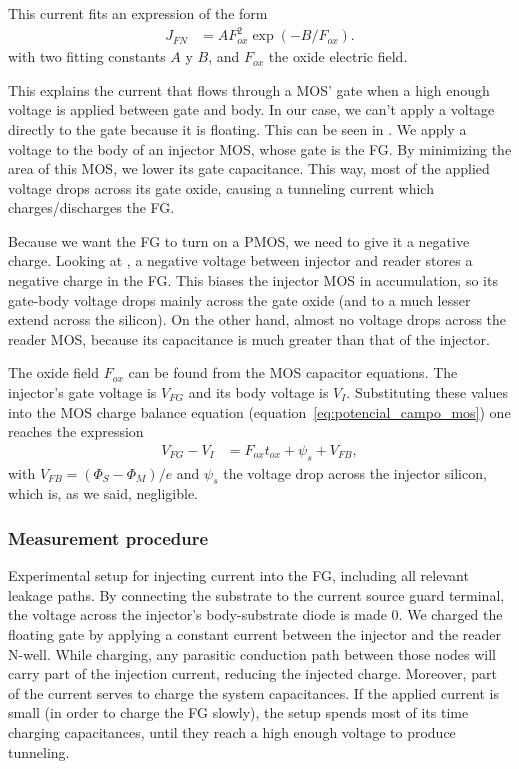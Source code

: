 This current fits an expression of the form
\begin{align*}
    J_{FN} &= AF_{ox}^2\exp(-B/F_{ox}).
\end{align*}
with two fitting constants $A$ y $B$,
and $F_{ox}$ the oxide electric field.

This explains the current that flows through a MOS' gate
when a high enough voltage is applied between gate and body.
In our case, we can't apply a voltage directly to the gate because it is floating.
This can be seen in .
We apply a voltage to the body of an injector MOS,
whose gate is the FG.
By minimizing the area of this MOS,
we lower its gate capacitance.
This way, most of the applied voltage drops across its gate oxide,
causing a tunneling current which charges/discharges the FG.

Because we want the FG to turn on a PMOS,
we need to give it a negative charge.
Looking at ,
a negative voltage between injector and reader
stores a negative charge in the FG.
This biases the injector MOS in accumulation,
so its gate-body voltage drops mainly across the gate oxide
(and to a much lesser extend across the silicon).
On the other hand, almost no voltage drops across the reader MOS,
because its capacitance is much greater than that of the injector.

The oxide field $F_{ox}$ can be found from the MOS capacitor equations.
The injector's gate voltage is $V_{FG}$
and its body voltage is $V_I$.
Substituting these values into the MOS charge balance equation
(equation~\ref{eq:potencial_campo_mos})
one reaches the expression
\begin{align*}
    V_{FG}-V_I &= F_{ox}t_{ox}+\psi_s+V_{FB},
\end{align*}
with $V_{FB}=(\Phi_S-\Phi_M)/e$ 
and $\psi_s$ the voltage drop across the injector silicon,
which is, as we said, negligible.
%
\subsubsection{Measurement procedure}
{Experimental setup for injecting current into the FG,
including all relevant leakage paths.
By connecting the substrate to the current source guard terminal,
the voltage across the injector's body-substrate diode is made 0.}
We charged the floating gate by applying a constant current 
between the injector and the reader N-well.
While charging, any parasitic conduction path between those nodes
will carry part of the injection current,
reducing the injected charge.
Moreover, part of the current serves to charge the system capacitances.
If the applied current is small (in order to charge the FG slowly),
the setup spends most of its time charging capacitances,
until they reach a high enough voltage to produce tunneling.

